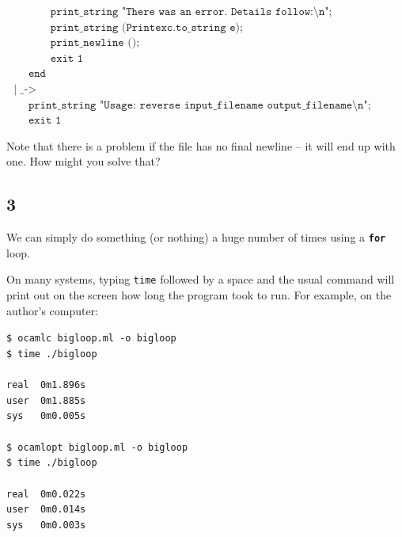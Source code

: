 \documentclass[]{book}
\newcommand{\smspace}{\vspace{4mm}}
\begin{document}
\begin{center}
{\begin{minipage}{0.9\textwidth}
$\texttt{~~~~~~~~~~~~print\_string "There was an error.\ Details follow:\textbackslash n";}$\\
$\texttt{~~~~~~~~~~~~print\_string (Printexc.to\_string e);}$\\
$\texttt{~~~~~~~~~~~~print\_newline ();}$\\
$\texttt{~~~~~~~~~~~~exit 1}$\\
$\texttt{~~~~~~end}$\\
$\texttt{~~|~\_ ->}$\\
$\texttt{~~~~~~print\_string "Usage:\ reverse input\_filename output\_filename\textbackslash n";}$\\
$\texttt{~~~~~~exit 1}$\vphantom{g}
\end{minipage}}
\end{center}
\smspace

\noindent Note that there is a problem if the file has no final newline -- it will end
up with one. How might you solve that?

\subsection*{3}
We can simply do something (or nothing) a huge number of times using a \textbf{\texttt{for}} loop. 

\smspace
\noindent{}
\smspace

\noindent On many systems, typing \texttt{time} followed by a space and the usual command will print out on the screen how long the program took to run. For example, on the author's computer:

\smspace
\noindent\texttt{\$ ocamlc bigloop.ml -o bigloop}\\
\texttt{\$ time ./bigloop}\\
\\
\texttt{real\ \ 0m1.896s}\\
\texttt{user\ \ 0m1.885s}\\
\texttt{sys\ \ \ 0m0.005s}\\
\\
\texttt{\$ ocamlopt bigloop.ml -o bigloop}\\
\texttt{\$ time ./bigloop}\\
\\
\texttt{real\ \ 0m0.022s}\\
\texttt{user\ \ 0m0.014s}\\
\texttt{sys\ \ \ 0m0.003s}\vphantom{g}
\smspace
\end{document}
